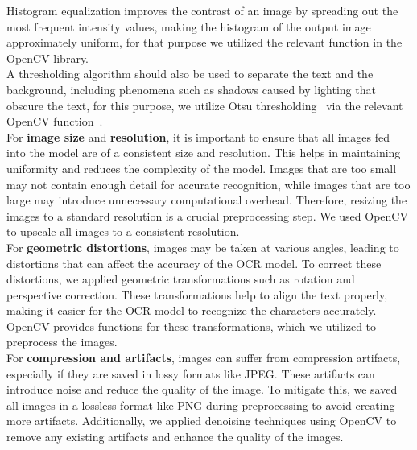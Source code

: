 \documentclass[twoside,a4paper]{article}
\begin{document}
Histogram equalization improves the contrast of an image by spreading out the most frequent intensity values, making the histogram of the output image approximately uniform, for that purpose we utilized the relevant function in the OpenCV library.~\cite{OpenCV_Histogram_Equalization}\\
A thresholding algorithm should also be used to separate the text and the background, including phenomena such as shadows caused by lighting that obscure the text, for this purpose, we utilize Otsu thresholding~\cite{Tensmeyer2015} via the relevant OpenCV function~\cite{OpenCVThresholding}.
\\
For \textbf{image size} and \textbf{resolution}, it is important to ensure that all images fed into the model are of a consistent size and resolution. This helps in maintaining uniformity and reduces the complexity of the model. Images that are too small may not contain enough detail for accurate recognition, while images that are too large may introduce unnecessary computational overhead. Therefore, resizing the images to a standard resolution is a crucial preprocessing step. We used OpenCV to upscale all images to a consistent resolution.
\\
For \textbf{geometric distortions}, images may be taken at various angles, leading to distortions that can affect the accuracy of the OCR model. To correct these distortions, we applied geometric transformations such as rotation and perspective correction. These transformations help to align the text properly, making it easier for the OCR model to recognize the characters accurately. OpenCV provides functions for these transformations, which we utilized to preprocess the images.
\\
For \textbf{compression and artifacts}, images can suffer from compression artifacts, especially if they are saved in lossy formats like JPEG. These artifacts can introduce noise and reduce the quality of the image. To mitigate this, we saved all images in a lossless format like PNG during preprocessing to avoid creating more artifacts. Additionally, we applied denoising techniques using OpenCV to remove any existing artifacts and enhance the quality of the images.
\end{document}
